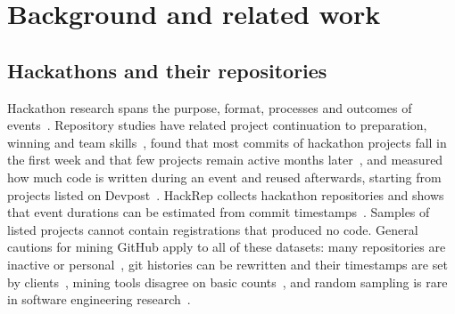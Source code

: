 \documentclass{article}
\begin{document}
\section{Background and related work}\label{sec:related}

\subsection{Hackathons and their repositories}
Hackathon research spans the purpose, format, processes and outcomes of events~\cite{chau2023hackathons}. Repository studies have related project continuation to preparation, winning and team skills~\cite{nolte2020hackathon}, found that most commits of hackathon projects fall in the first week and that few projects remain active months later~\cite{mcintosh2021hackathon}, and measured how much code is written during an event and reused afterwards, starting from \devpostprojects{} projects listed on Devpost~\cite{imam2021secretlife,mahmoud2022oneoff}. HackRep collects \hackrepsize{} hackathon repositories and shows that event durations can be estimated from commit timestamps~\cite{halmans2026hackrep}. Samples of listed projects cannot contain registrations that produced no code. General cautions for mining GitHub apply to all of these datasets: many repositories are inactive or personal~\cite{kalliamvakou2014perils}, git histories can be rewritten and their timestamps are set by clients~\cite{bird2009git}, mining tools disagree on basic counts~\cite{hoess2025toolmatter}, and random sampling is rare in software engineering research~\cite{baltes2022sampling}.
\end{document}
